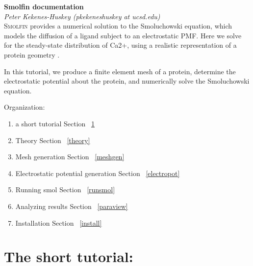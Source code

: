 \documentclass{article}
\begin{document}
\newcommand{\mynote}[1]{\textcolor{pink}{ #1 }}
\newcommand\lbi{\begin{itemize}}
\newcommand\lei{\end{itemize}}
\newcommand\lbn{\begin{enumerate}}
\newcommand\len{\end{enumerate}}

\newcommand{\figsquick}[4]
{
\begin{figure}[ht]
  \begin{center}
    \texttt{[image: \#1]}
  \end{center}
  \caption{#3\label{figshort:#2}}
\end{figure}
}


\newcommand{\figshort}[3]
{
  \figsquick{#1}{#2}{#3}{3in}
}


\newcommand\sect{Section ~\ref}
\newcommand{\catwo}{Ca2+}
\newcommand{\ol}{OL}
\newcommand{\raw}{\rightarrow}
\newcommand{\R}{R}
\newcommand{\p}{\partial}
\newcommand{\bx}{x}
\newcommand{\ka}{ka}


\textbf{Smolfin documentation}\\

\textit{Peter Kekenes-Huskey (pkekeneshuskey at ucsd.edu) }\\ 

\textsc{Smolfin} provides a numerical solution to the Smoluchowski equation, which models the diffusion of a ligand  subject to an electrostatic PMF. Here we solve for the steady-state distribution of \catwo, using a realistic representation of a protein geometry \cite{KekenesHuskey:vt}.

In this tutorial, we produce a finite element mesh of a protein, determine the electrostatic potential about the protein, and numerically solve the Smoluchowski equation. 

Organization:
\lbn
\item a short tutorial \sect{120717:nbcr:doc}
\item Theory \sect{theory}
\item Mesh generation \sect{meshgen}
\item Electrostatic potential generation \sect{electropot}
\item Running smol \sect{runsmol} 
\item Analyzing results \sect{paraview}
\item Installation \sect{install} 
\len
\newpage

%

\section{The short tutorial:}
\label{120717:nbcr:doc}
\end{document}
